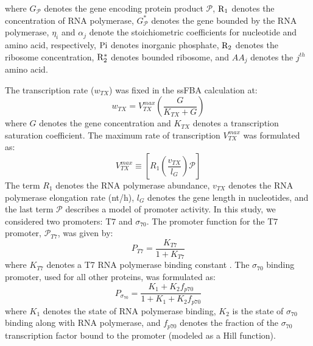 \documentclass[journal=asbcd6,manuscript=article]{achemso}
\begin{document}
where $G_{\mathcal{P}}$ denotes the gene encoding protein product $\mathcal{P}$,
$\rm R_{1}$ denotes the concentration of RNA polymerase,
$G_{\mathcal{P}}^{*}$ denotes the gene bounded by the RNA polymerase,
$\eta_{i}$ and $ \alpha_{j}$ denote the stoichiometric coefficients for nucleotide and amino acid, respectively,
$\rm Pi$ denotes inorganic phosphate,
$\rm R_{2}$ denotes the ribosome concentration,
$\rm R_{2}^{*}$ denotes bounded ribosome,
and $AA_{j}$ denotes the $j^{th}$ amino acid.

The transcription rate ($w_{TX}$) was fixed in the ssFBA calculation at:
\begin{equation}
	w_{TX} = V_{TX}^{max}\left(\frac{G}{K_{TX}+G}\right)
\end{equation}
where $G$ denotes the gene concentration and $K_{TX}$ denotes a transcription saturation coefficient.
The maximum rate of transcription $V_{TX}^{max}$ was formulated as:
\begin{equation}
	V_{TX}^{max} \equiv \left[R_{1}\left(\frac{v_{TX}}{l_{G}}\right)\mathcal{P}\right]
\end{equation}
The term $R_{1}$ denotes the RNA polymerase abundance,
$v_{TX}$ denotes the RNA polymerase elongation rate (nt/h),
$l_{G}$ denotes the gene length in nucleotides, and the last term $\mathcal{P}$ describes a model of promoter activity.
In this study, we considered two promoters: T7 and $\sigma_{70}$.
The promoter function for the T7 promoter, $\mathcal{P}_{T7}$, was given by:
\begin{equation}
	P_{T7} = \frac{K_{T7}}{1 + K_{T7}}
\end{equation}
where $K_{T7}$ denotes a T7 RNA polymerase binding constant \cite{Moon:2012aa}.
The $\sigma_{70}$ binding promoter, used for all other proteins, was formulated as:
\begin{equation}
	P_{\sigma_{70}} = \frac{K_{1}+K_{2}f_{p70}}{1 + K_{1}+K_{2}f_{p70}}
\end{equation}
where $K_{1}$ denotes the state of RNA polymerase binding,
$K_{2}$ is the state of $\sigma_{70}$ binding along with RNA polymerase, and $f_{p70}$ denotes the fraction of the $\sigma_{70}$ transcription factor bound to the promoter (modeled as a Hill function).
\end{document}
